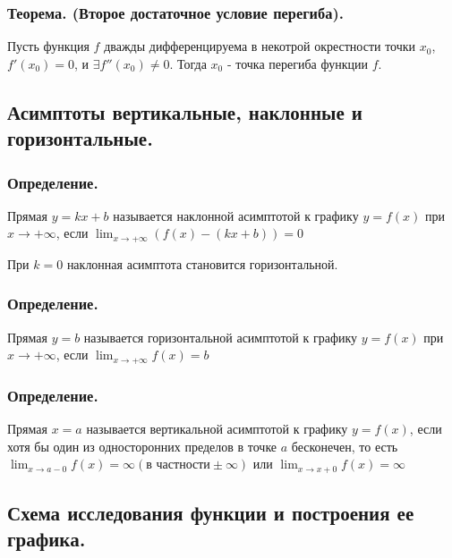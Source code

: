 \documentclass[a4paper,12pt]{article}
\theoremstyle{plain} %
\theoremstyle{definition} %
\theoremstyle{remark} %
\begin{document}
\subsubsection*{Теорема. (Второе достаточное условие перегиба).}
Пусть функция $f$ дважды дифференцируема в некотрой окрестности точки $x_0$, $f'(x_0) = 0$, и $\exists f''(x_0) \neq 0$. Тогда $x_0$ - точка перегиба функции $f$.

\newpage
{}
\subsection*{Асимптоты вертикальные, наклонные и горизонтальные.                                                      }
\subsubsection*{Определение.}
Прямая $y = kx + b$ называется наклонной асимптотой к графику $y = f(x)$ при $x \rightarrow +\infty$, если $\lim_{x \rightarrow +\infty}(f(x) - (kx + b)) = 0$

При $k = 0$ наклонная асимптота становится горизонтальной.

\subsubsection*{Определение.}
Прямая $y = b$ называется горизонтальной асимптотой к графику $y = f(x)$ при $x \rightarrow +\infty$, если $\lim_{x \rightarrow +\infty} f(x) = b$

\subsubsection*{Определение.}
Прямая $x = a$ называется вертикальной асимптотой к графику $y = f(x)$, если хотя бы один из односторонних пределов в точке $a$ бесконечен, то есть $\lim_{x \rightarrow a - 0}f(x) = \infty (\text{в частности} \pm \infty)$ или $\lim_{x \rightarrow x + 0}f(x) = \infty$



\newpage
{}
\subsection*{Схема исследования функции и построения ее графика.                                                      }
\end{document}

